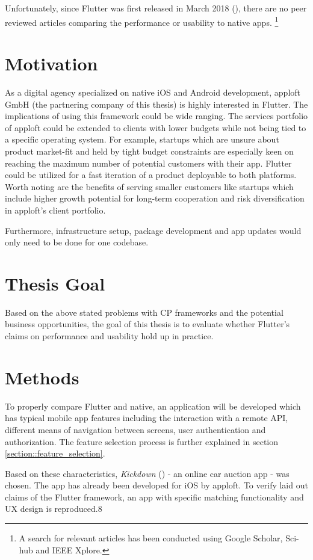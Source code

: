 Unfortunately, since Flutter was first released in March 2018 (\cite{FlutterReleases2020}), 
there are no peer reviewed articles comparing the performance or usability to native apps.
\footnote{A search for relevant articles has been conducted using Google Scholar, Sci-hub and IEEE Xplore.} 

\section{Motivation}
As a digital agency specialized on native iOS and Android development, apploft GmbH 
(the partnering company of this thesis) is highly interested in Flutter. 
The implications of using this framework could be wide ranging. 
The services portfolio of apploft could be extended to clients with lower budgets while not being tied to a specific operating system.
For example, startups which are unsure about product market-fit and held by tight budget constraints are especially keen on reaching 
the maximum number of potential customers with their app. Flutter could be utilized for a fast iteration of a product deployable to 
both platforms. 
Worth noting are the benefits of serving smaller customers like startups which include higher growth potential for long-term cooperation
and risk diversification in apploft's client portfolio.

Furthermore, infrastructure setup, package development and app updates would only need to be done for one codebase.

\section{Thesis Goal}
Based on the above stated problems with CP frameworks and the potential business opportunities, the goal of this thesis is to evaluate 
whether Flutter's claims on performance and usability hold up in practice.

\section{Methods}
\label{section:methods}
To properly compare Flutter and native, an application will be developed which has
typical mobile app features including the interaction with a remote API, different means of navigation between screens, 
user authentication and authorization. The feature selection process is further explained in section \ref{section::feature_selection}.

Based on these characteristics, \textit{Kickdown} (\cite{Kickdown2021}) - an online car auction app - was chosen. 
The app has already been developed for iOS by apploft.
To verify laid out claims of the Flutter framework, an app with specific matching functionality and UX design is reproduced.8

